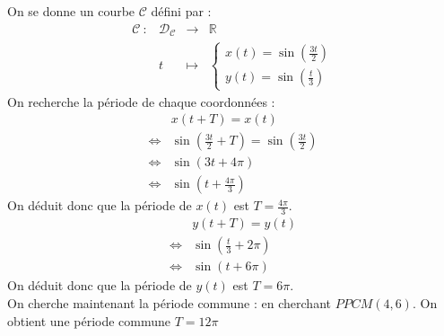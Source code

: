 \begin{ex}
On se donne un courbe $\mathscr{C}$ défini par  :
$$\begin{array}{cccc}
    \mathscr{C} \ : & \mathscr{D}_{\mathscr{C}} & \to & \mathbb{R} \\
         & t & \mapsto & \begin{cases}x(t)=\sin(\frac{3t}{2})\\y(t)=\sin(\frac{t}{3})\end{cases}
\end{array}$$
On recherche la période de chaque coordonnées :
\begin{align*}
    & x(t+T)=x(t)\\
    \Leftrightarrow & \sin\left(\frac{3t}{2}+T\right)=\sin\left(\frac{3t}{2}\right) \\
    \Leftrightarrow & \sin\left(3t+4\pi\right)\\
    \Leftrightarrow & \sin\left(t+\frac{4\pi}{3}\right)
\end{align*}
On déduit donc que la période de $x(t)$ est $T=\frac{4\pi}{3}$.
\begin{align*}
    & y(t+T)=y(t)\\
    \Leftrightarrow & \sin\left(\frac{t}{3}+2\pi\right) \\
    \Leftrightarrow & \sin\left(t+6\pi\right)
\end{align*}
On déduit donc que la période de $y(t)$ est $T=6\pi$.\\
On cherche maintenant la période commune : en cherchant $PPCM(4,6)$.
On obtient une période commune $T=12\pi$
\end{ex}
